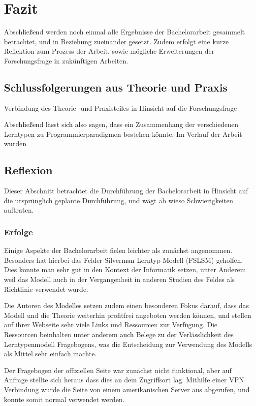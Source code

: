 \clearpage
\section{Fazit}
\label{sec:conclusion}

Abschließend werden noch einmal alle Ergebnisse der Bachelorarbeit gesammelt betrachtet, und in Beziehung zueinander gesetzt. Zudem erfolgt eine kurze Reflektion zum Prozess der Arbeit, sowie mögliche Erweiterungen der Forschungsfrage in zukünftigen Arbeiten.

\subsection{Schlussfolgerungen aus Theorie und Praxis}
Verbindung des Theorie- und Praxisteiles in Hinsicht auf die Forschungsfrage

Abschließend lässt sich also sagen, dass ein Zusammenhang der verschiedenen Lerntypen zu Programmierparadigmen bestehen könnte. Im Verlauf der Arbeit wurden 

\subsection{Reflexion}
Dieser Abschnitt betrachtet die Durchführung der Bachelorarbeit in Hinsicht auf die ursprünglich geplante Durchführung, und wägt ab wieso Schwierigkeiten auftraten.

\subsubsection{Erfolge}
Einige Aspekte der Bachelorarbeit fielen leichter als zunächst angenommen. Besonders hat hierbei das Felder-Silverman Lerntyp Modell (FSLSM) geholfen. Dies konnte man sehr gut in den Kontext der Informatik setzen, unter Anderem weil das Modell auch in der Vergangenheit in anderen Studien des Feldes als Richtlinie verwendet wurde.

Die Autoren des Modelles setzen zudem einen besonderen Fokus darauf, dass das Modell und die Theorie weiterhin profitfrei angeboten werden können, und stellen auf ihrer Webseite sehr viele Links und Ressourcen zur Verfügung. Die Ressourcen beinhalten unter anderem auch Belege zu der Verlässlichkeit des Lerntypenmodell Fragebogens, was die Entscheidung zur Verwendung des Modells als Mittel sehr einfach machte.

Der Fragebogen der offiziellen Seite war zunächst nicht funktional, aber auf Anfrage stellte sich heraus dass dies an dem Zugriffsort lag. Mithilfe einer VPN Verbindung wurde die Seite von einem amerikanischen Server aus abgerufen, und konnte somit normal verwendet werden. %


